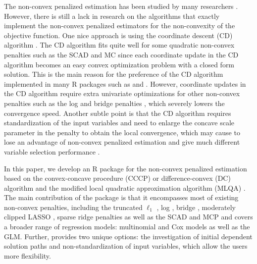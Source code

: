 The non-convex penalized estimation has been studied by many researchers
\citep{fan2001variable,kim2008smoothly,huang2008asymptotic,zou2008one,zhang2012general,kwon2012large,friedman2012fast}.
However, there is still a lack in research on the algorithms that exactly implement the non-convex penalized estimators for the non-convexity of the objective function.
One nice approach is using the coordinate descent (CD) algorithm \citep{tseng2001convergence,breheny2011coordinate}.
The CD algorithm fits quite well for some quadratic non-convex penalties
such as the SCAD and MC \citep{mazumder2011sparsenet,breheny2011coordinate,jiang2014majorization}
since each coordinate update in the CD algorithm becomes an easy convex optimization problem with a closed form solution.
This is the main reason for the preference of the CD algorithm implemented in many R packages such as  and .
However, coordinate updates in the CD algorithm require extra univariate optimizations
for other non-convex penalties such as the log and bridge penalties \citep{zou2008one,huang2008asymptotic,friedman2012fast},
which severely lowers the convergence speed.
Another subtle point is that the CD algorithm requires standardization of the input variables
and need to enlarge the concave scale parameter in the penalty \citep{breheny2011coordinate}
to obtain the local convergence, which may cause to lose an advantage of non-convex penalized estimation \citep{kim2012global}
and give much different variable selection performance \citep{lee2015stand}.

In this paper, we develop an R package  for the non-convex penalized estimation
based on the convex-concave procedure (CCCP) or difference-convex (DC) algorithm \citep{kim2008smoothly,shen2012likelihood}
and the modified local quadratic approximation algorithm (MLQA) \citep{lee2016modified}.
The main contribution of the package  is that it encompasses most of existing non-convex penalties, including
the truncated $\ell_1$ \citep{shen2013constrained},
log \citep{zou2008one,friedman2012fast},
bridge \citep{huang2008asymptotic},
moderately clipped LASSO \citep{kwon2015moderately},
sparse ridge \citep{huang2016mnet,choi2013sparse}
penalties as well as the SCAD and MCP
and covers a broader range of regression models: multinomial and Cox models as well as the GLM.
Further,  provides two unique options:
the investigation of initial dependent solution paths and non-standardization of input variables, which allow the users more flexibility.


